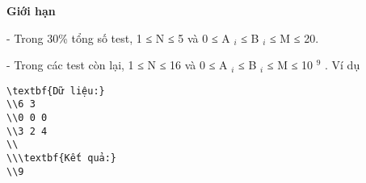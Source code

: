 \textbf{    Giới hạn
}

   - Trong 30\% tổng số test, 1 ≤ N ≤ 5 và 0 ≤ A   $_    i   $   ≤ B   $_    i   $   ≤ M ≤ 20.  

   - Trong các test còn lại, 1 ≤ N ≤ 16 và 0 ≤ A   $_    i   $   ≤ B   $_    i   $   ≤ M ≤ 10   $^    9   $   .
Ví dụ
\begin{verbatim}
\textbf{Dữ liệu:}
\\6 3
\\0 0 0
\\3 2 4
\\
\\\textbf{Kết quả:}
\\9\end{verbatim}
